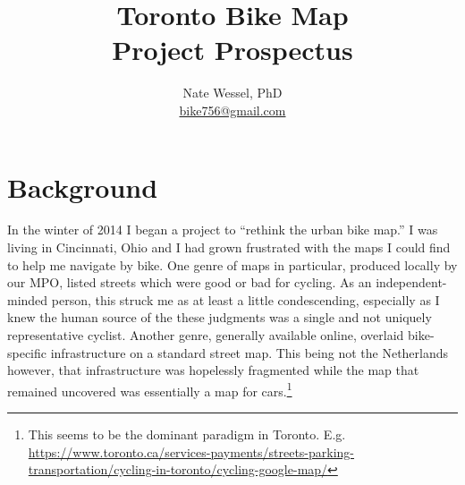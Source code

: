 \documentclass{article}
\title{Toronto Bike Map \\ Project Prospectus}
\author{Nate Wessel, PhD \\ \href{mailto:bike756@gmail.com}{bike756@gmail.com}}
\begin{document}
	\maketitle
	
	\section*{Background}
		In the winter of 2014 I began a project to ``rethink the urban bike map.'' 
		I was living in Cincinnati, Ohio and I had grown frustrated with the maps I could find to help me navigate by bike. One genre of maps in particular, produced locally by our MPO, listed streets which were {\color{ForestGreen}good} or {\color{red}bad} for cycling. As an independent-minded person, this struck me as at least a little condescending, especially as I knew the human source of the these judgments was a single and not uniquely representative cyclist.
		Another genre, generally available online, overlaid bike-specific infrastructure on a standard street map. This being not the Netherlands however, that infrastructure was hopelessly fragmented while the map that remained uncovered was essentially a map for cars.\footnote{This seems to be the dominant paradigm in Toronto. E.g. \href{https://www.toronto.ca/services-payments/streets-parking-transportation/cycling-in-toronto/cycling-google-map/}{https://www.toronto.ca/services-payments/streets-parking-transportation/cycling-in-toronto/cycling-google-map/}}
	
\end{document}
